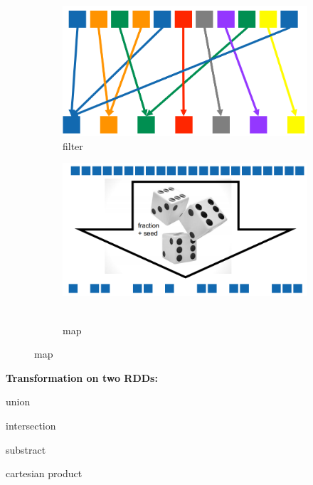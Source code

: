 \documentclass[11pt,oneside,a4paper]{article}
\begin{document}
\begin{figure}[t!]
	\centering
	\begin{subfigure}[t]{.3\textwidth}
		\centering
		\includegraphics[width=0.7\linewidth]{figures/spark_distinct}
		\caption{filter}
	\end{subfigure}%
	\begin{subfigure}[t]{.3\textwidth}
		\centering
		\includegraphics[width=0.7\linewidth]{figures/spark_sample}\
		\caption{map}
	\end{subfigure}
\end{figure}

\textbf{Transformation on two RDDs:}
\begin{compactitem}
\item union
\item intersection
\item substract
\item cartesian product
\end{compactitem}
\end{document}
